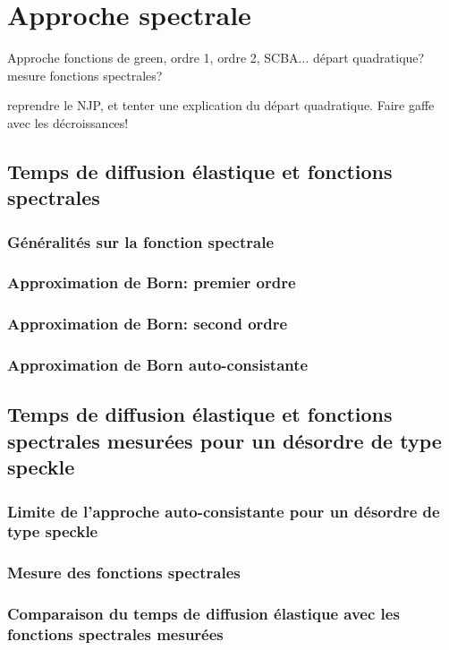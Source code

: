 

\chapter{Approche spectrale}
\label{ch:TauS_NJP}

Approche fonctions de green, ordre 1, ordre 2, SCBA...
départ quadratique?
mesure fonctions spectrales?

reprendre le NJP, et tenter une explication du départ quadratique. Faire gaffe avec les décroissances!


\section{Temps de diffusion élastique et fonctions spectrales}
\subsection{Généralités sur la fonction spectrale}
\subsection{Approximation de Born: premier ordre}
\subsection{Approximation de Born: second ordre}
\subsection{Approximation de Born auto-consistante}

\section{Temps de diffusion élastique et fonctions spectrales mesurées pour un désordre de type speckle}
\subsection{Limite de l'approche auto-consistante pour un désordre de type speckle}
\subsection{Mesure des fonctions spectrales}
\subsection{Comparaison du temps de diffusion élastique avec les fonctions spectrales mesurées}
